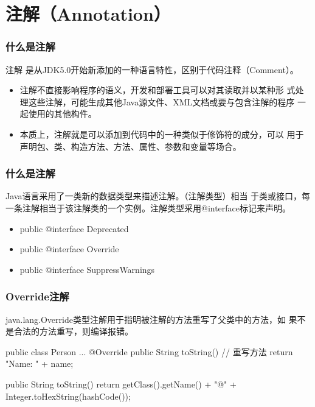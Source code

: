 \section{注解（Annotation）}

\begin{frame}[fragile] %
  \frametitle{什么是注解}

  \begin{block}{注解}
    是从JDK5.0开始新添加的一种语言特性，区别于代码注释（Comment）。
  \end{block}

  \begin{itemize}[<+-|alert@+>]
  \item 注解不直接影响程序的语义，开发和部署工具可以对其读取并以某种形
    式处理这些注解，可能生成其他Java源文件、XML文档或要与包含注解的程序
    一起使用的其他构件。
  \item 本质上，注解就是可以添加到代码中的一种类似于修饰符的成分，可以
    用于声明包、类、构造方法、方法、属性、参数和变量等场合。
  \end{itemize}
\end{frame}

\begin{frame}[fragile] %
  \frametitle{什么是注解}

  Java语言采用了一类新的数据类型来描述注解。（{\hei\Red 注解类型}）相当
  于类或接口，每一条注解相当于该注解类的一个实例。注解类型采用@interface标记来声明。

  
  \begin{itemize}
  \item public @interface Deprecated
  \item public @interface Override
  \item public @interface SuppressWarnings
  \end{itemize}
\end{frame}

\begin{frame}[fragile] %
  \frametitle{Override注解}

  java.lang.Override类型注解用于指明被注解的方法重写了父类中的方法，如
  果不是合法的方法重写，则编译报错。

  \begin{javaCode}
    public class Person {
      ...
      @Override
      public String toString() { // 重写方法
        return "Name: " + name; 
      }
    }
  \end{javaCode}

  
  \begin{javaCode}
    public String toString() {
      return getClass().getName() + "@" + Integer.toHexString(hashCode());
    }  
  \end{javaCode}
\end{frame}

